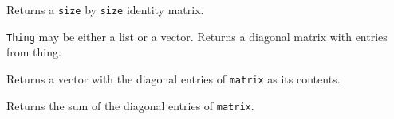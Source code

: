 \begin{description}
\item{}
Returns a {\tt size} by {\tt size} identity matrix.

\item{}
{\tt Thing} may be either a list or a vector.  Returns a diagonal
matrix with entries from thing.

\item{}
Returns a vector with the diagonal entries of {\tt matrix}
as its contents.

\item{}
Returns the sum of the  diagonal entries of {\tt matrix}.

\end{description}



